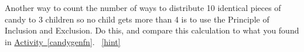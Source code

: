 \documentclass{book}
\begin{document}
\setcounter{project}{256}
\addtocounter{project}{-1}
\begin{activity}[]\label{activity-249}
\hypertarget{p-1368}{}%
Another way to count the number of ways to distribute 10 identical pieces of candy to 3 children so no child gets more than 4 is to use the Principle of Inclusion and Exclusion.  Do this, and compare this calculation to what you found in \hyperref[candygenfn]{Activity~\ref{candygenfn}}.%
~\hfill{\tiny\hyperlink{a-256}{[hint]}\hypertarget{q-256}{}}\end{activity}
\end{document}
